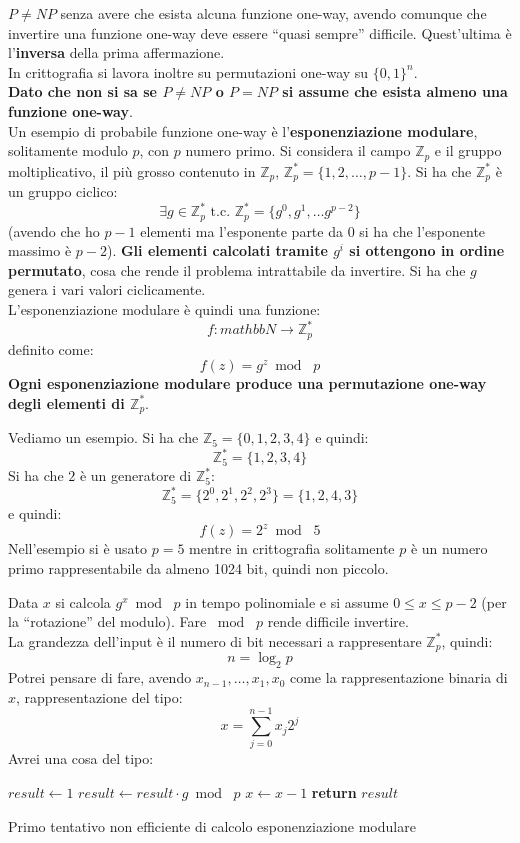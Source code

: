 \documentclass[a4paper,12pt, oneside]{book}
\begin{document}
$P\neq NP$ senza avere che esista alcuna funzione one-way, avendo comunque che
invertire una funzione one-way deve essere ``quasi sempre''
difficile. Quest'ultima è l'\textbf{inversa} della prima affermazione.\\
In crittografia si lavora inoltre su permutazioni one-way su $\{0,1\}^n$.\\
\textbf{Dato che non si sa se $P\neq NP$ o $P=NP$ si assume che esista almeno
  una funzione one-way}.\\
Un esempio di probabile funzione one-way è l'\textbf{esponenziazione modulare},
solitamente modulo $p$, con $p$ numero primo. Si considera il campo
$\mathbb{Z}_p$ e il gruppo moltiplicativo, il più grosso contenuto in
$\mathbb{Z}_p$, $\mathbb{Z}^*_p=\{1,2,\ldots, p-1\}$.  Si ha che
$\mathbb{Z}^*_p$ è un gruppo ciclico:
\[\exists g\in \mathbb{Z}^*_p \mbox{ t.c. } \mathbb{Z}^*_p=\{g^0,g^1,\ldots
  g^{p-2}\}\]
(avendo che ho $p-1$ elementi ma l'esponente parte da 0 si ha che l'esponente
massimo è $p-2$). \textbf{Gli elementi calcolati tramite $g^i$ si ottengono in
  ordine permutato}, cosa che rende il problema intrattabile da invertire. Si ha
che $g$ genera i vari valori ciclicamente.\\ 
L'esponenziazione modulare è quindi una funzione:
\[f:mathbb{N}\to \mathbb{Z}^*_p\]
definito come:
\[f(z)=g^z\bmod\,\,p\]
\textbf{Ogni esponenziazione modulare produce una permutazione one-way degli
  elementi di $\mathbb{Z}^*_p$}.
\begin{esempio}
  Vediamo un esempio.
  Si ha che $\mathbb{Z}_5=\{0,1,2,3,4\}$ e quindi:
  \[\mathbb{Z}^*_5=\{1,2,3,4\}\]
  Si ha che $2$ è un generatore di $\mathbb{Z}^*_5$:
  \[\mathbb{Z}^*_5=\{2^0,2^1,2^2,2^3\}=\{1,2,4,3\}\]
  e quindi:
  \[f(z)=2^z\bmod\,\,5\]
  Nell'esempio si è usato $p=5$ mentre in crittografia solitamente $p$ è un
  numero primo rappresentabile da almeno 1024 bit, quindi non piccolo.
\end{esempio}
Data $x$ si calcola $g^x\bmod\,\,p$ in tempo polinomiale e si assume $0\leq
x\leq p-2$ (per la ``rotazione'' del modulo). Fare $\bmod\,\,p$ rende difficile
invertire. \\ 
La grandezza dell'input è il numero di bit necessari a rappresentare
$\mathbb{Z}^*_p$, quindi:
\[n=\log_2p\]
Potrei pensare di fare, avendo $x_{n-1},\ldots, x_1, x_0$ come la
rappresentazione binaria di $x$, rappresentazione del tipo:
\[x=\sum_{j=0}^{n-1}x_j2^j\]
Avrei una cosa del tipo:
\begin{algorithm}[H]
  \begin{algorithmic}
    \State $result\gets 1$
    \State $result \gets result \cdot g\bmod\,\,p$
    \State $x\gets x-1$
    \EndWhile
    \State \textbf{return} $result$ 
    \EndFunction
  \end{algorithmic}
  \caption{Primo tentativo non efficiente di calcolo esponenziazione modulare}
\end{algorithm}
\end{document}
